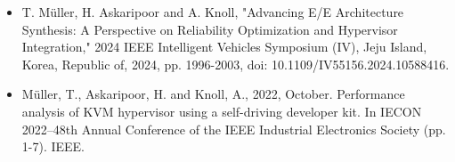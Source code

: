 \begin{itemize}
        \item T. Müller, H. Askaripoor and A. Knoll, "Advancing E/E Architecture Synthesis: A Perspective on Reliability Optimization and Hypervisor Integration," 2024 IEEE Intelligent Vehicles Symposium (IV), Jeju Island, Korea, Republic of, 2024, pp. 1996-2003, doi: 10.1109/IV55156.2024.10588416. 
        
        \item Müller, T., Askaripoor, H. and Knoll, A., 2022, October. Performance analysis of KVM hypervisor using a self-driving developer kit. In IECON 2022–48th Annual Conference of the IEEE Industrial Electronics Society (pp. 1-7). IEEE.
        
    \end{itemize}
    
    
    
    
    
    
